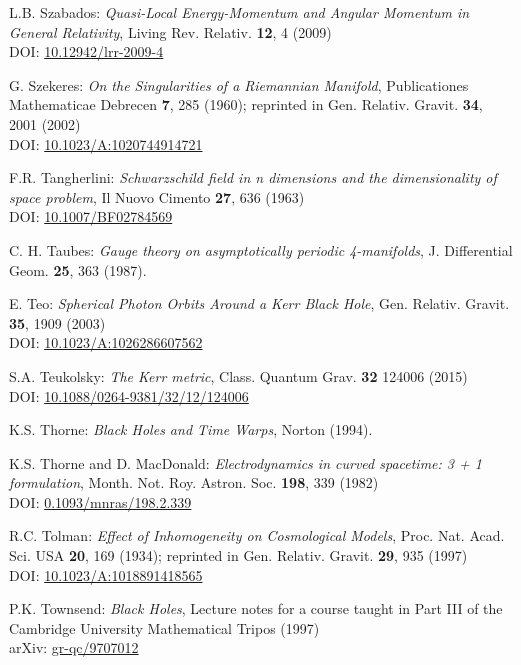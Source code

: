 \begin{thebibliography}{123}
L.B. Szabados:
{\em Quasi-Local Energy-Momentum and Angular Momentum in General Relativity},
Living Rev. Relativ. {\bf 12}, 4 (2009)\\
DOI: \href{https://doi.org/10.12942/lrr-2009-4}{10.12942/lrr-2009-4}

G. Szekeres: {\em On the Singularities of a Riemannian Manifold},
Publicationes Mathematicae Debrecen {\bf 7}, 285 (1960); reprinted in
Gen. Relativ. Gravit. {\bf 34}, 2001 (2002)\\
DOI: \href{https://doi.org/10.1023/A:1020744914721}{10.1023/A:1020744914721}

F.R. Tangherlini:
{\em Schwarzschild field in n dimensions and the dimensionality of space problem},
Il Nuovo Cimento {\bf 27}, 636 (1963)\\
DOI: \href{https://doi.org/10.1007/BF02784569}{10.1007/BF02784569}

C. H. Taubes: {\em Gauge theory on asymptotically periodic 4-manifolds},
J. Differential Geom. {\bf 25}, 363 (1987).

E. Teo: {\em Spherical Photon Orbits Around a Kerr Black Hole},
Gen. Relativ. Gravit. {\bf 35}, 1909 (2003)\\
DOI: \href{https://doi.org/10.1023/A:1026286607562}{10.1023/A:1026286607562}

S.A. Teukolsky: {\em The Kerr metric},
Class. Quantum Grav. {\bf 32} 124006 (2015)\\
DOI: \href{https://doi.org/10.1088/0264-9381/32/12/124006}{10.1088/0264-9381/32/12/124006}

K.S. Thorne: {\em Black Holes and Time Warps}, Norton (1994).

K.S. Thorne and D. MacDonald: {\em Electrodynamics in curved spacetime: 3 + 1 formulation},
Month. Not. Roy. Astron. Soc. {\bf 198}, 339 (1982)\\
DOI: \href{https://doi.org/10.1093/mnras/198.2.339}{0.1093/mnras/198.2.339}

R.C. Tolman:
{\em Effect of Inhomogeneity on Cosmological Models},
Proc. Nat. Acad. Sci. USA {\bf 20}, 169 (1934);
reprinted in Gen. Relativ. Gravit. {\bf 29}, 935 (1997)\\
DOI: \href{https://doi.org/10.1023/A:1018891418565}{10.1023/A:1018891418565}

P.K. Townsend: {\em Black Holes}, Lecture notes for a course taught in Part III
of the Cambridge University Mathematical Tripos (1997) \\
arXiv: \href{https://arxiv.org/abs/gr-qc/9707012}{gr-qc/9707012}


\end{thebibliography}
